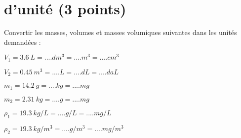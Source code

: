 \section{\Conversions d'unité (3 points)}\label{ex:convert}

Convertir les masses, volumes et masses volumiques suivantes dans les unités demandées :
\begin{questions}
	\begin{multicols}{2}
			
		\question[\half] $V_1 = \num{3.6}\  L = .... dm^3 = .... m^3 = ....cm^3 $
		
		\question[\half] $V_2 = \num{0.45}\  m^3 = .... L = .... dL = ....daL $
		
		\question[\half] $m_1 = \num{14.2}\  g = .... kg = .... mg $
		
		\question[\half] $m_2 = \num{2.31}\  kg = .... g = .... mg $
		
		\question[\half] $\rho _1 = \num{19.3}\  kg/L = .... g/L = .... mg/L $
		
		\question[\half] $\rho _2 = \num{19.3}\  kg/m^3 = .... g/m^3 = .... mg/m^3 $
	\end{multicols}
\end{questions}
